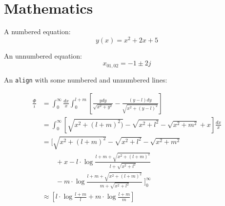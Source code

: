 \documentclass[a4paper,11pt,oneside,showtrims]{alpenthesis}
\begin{document}
\thelstlisting
{}
\thelstlisting

\thelisting
{}
\thelisting

\tikzexternaldisable
\begin{tcolorbox}[title=test]
    \lipsum[2]
\end{tcolorbox}
\tikzexternalenable

\tikzexternaldisable
\begin{tcolorbox}
    \lipsum[2]
\end{tcolorbox}
\tikzexternalenable

\chapter{Mathematics}

A numbered equation:
\begin{equation}
    y(x) = x^2 + 2x + 5
\end{equation}

An unnumbered equation:
\begin{equation*}
    x_{01,02} = -1 \pm 2j
\end{equation*}

An \verb|align| with some numbered and unnumbered lines:

\begin{align}
    \frac{\Phi}{i}
    & =
    \int_{0}^{\infty} \frac{dx}{x} \int_{0}^{l+m}
    \left[
        \frac{y dy}{\sqrt{x^2+y^2}} - \frac{(y-l) dy}{\sqrt{x^2+(y-l)^2}}
    \right]
    \nonumber
    \\
    &=
    \int_{0}^{\infty}
    \left[
        \sqrt{x^2 + (l+m)^2)} - \sqrt{x^2+l^2} - \sqrt{x^2+m^2}+x
    \right]
    \frac{dx}{x}
    \nonumber
    \\
    &=
    \Bigg[
        \sqrt{x^2 + (l+m)^2} - \sqrt{x^2+l^2} - \sqrt{x^2+m^2}
        \nonumber
        \\
        & ~~~~~~~~~   + x - l \cdot \log{\frac{l+m+\sqrt{x^2+(l+m)^2}}{l+\sqrt{x^2+l^2}}}
        \nonumber
        \\
        & ~~~~~~~~~   - m \cdot \log{\frac{l+m+\sqrt{x^2+(l+m)^2}}{m+\sqrt{x^2+l^2}}} ~
    \Bigg]_0^{\infty}
    \label{eq:mISL:2}
    \\
    & \approx
    \left[ l \cdot \log{\frac{l+m}{l}} + m \cdot \log{\frac{l+m}{m}} \right]
    \label{eq:mISL:3}
\end{align}

\cleardoublepage
\begin{titlingpage*}
    \begin{vplace}
        \flushright\Huge\bfseries\sffamily\appendixpagename
    \end{vplace}
\end{titlingpage*}
\appendix
{}
\end{document}
